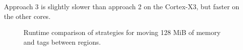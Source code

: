 Approach 3 is slightly slower than approach 2 on the Cortex-X3, but faster on the other cores.

\begin{figure}[h]
    \centering
    
    \caption{Runtime comparison of strategies for moving 128 MiB of memory and tags between regions.}
    \label{fig:migrate-performance}
\end{figure}
